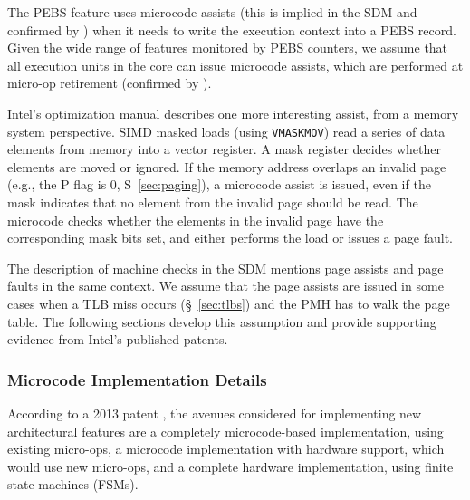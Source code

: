 The PEBS feature uses microcode assists (this is implied in the SDM and
confirmed by \cite{intel2014pebs}) when it needs to write the execution context
into a PEBS record. Given the wide range of features monitored by PEBS
counters, we assume that all execution units in the core can issue microcode
assists, which are performed at micro-op retirement (confirmed by
\cite{intel1997events}).


Intel's optimization manual describes one more interesting assist, from a
memory system perspective. SIMD masked loads (using \texttt{VMASKMOV}) read a
series of data elements from memory into a vector register. A mask register
decides whether elements are moved or ignored. If the memory address overlaps
an invalid page (e.g., the P flag is 0, S~\ref{sec:paging}), a microcode assist
is issued, even if the mask indicates that no element from the invalid page
should be read. The microcode checks whether the elements in the invalid page
have the corresponding mask bits set, and either performs the load or issues a
page fault.


The description of machine checks in the SDM mentions page assists and page
faults in the same context. We assume that the page assists are issued in some
cases when a TLB miss occurs (\S~\ref{sec:tlbs}) and the PMH has to walk the
page table. The following sections develop this assumption and provide
supporting evidence from Intel's published patents.


\subsubsection{Microcode Implementation Details}


According to a 2013 patent \cite{intel2013scattergather}, the avenues
considered for implementing new architectural features are a completely
microcode-based implementation, using existing micro-ops, a microcode
implementation with hardware support, which would use new micro-ops, and a
complete hardware implementation, using finite state machines (FSMs).


